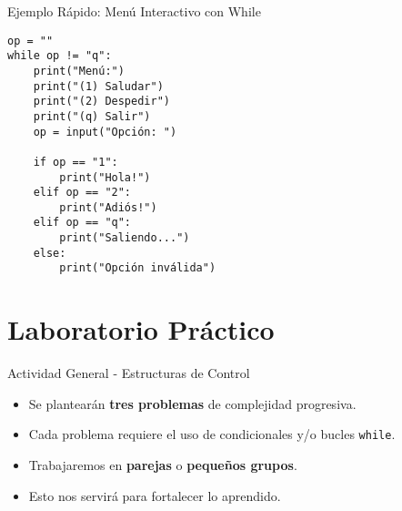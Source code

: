 \documentclass[10pt]{beamer}
\begin{document}
\begin{frame}[fragile]{Ejemplo Rápido: Menú Interactivo con While}
\begin{verbatim}
op = ""
while op != "q":
    print("Menú:")
    print("(1) Saludar")
    print("(2) Despedir")
    print("(q) Salir")
    op = input("Opción: ")

    if op == "1":
        print("Hola!")
    elif op == "2":
        print("Adiós!")
    elif op == "q":
        print("Saliendo...")
    else:
        print("Opción inválida")
\end{verbatim}
\end{frame}

\section{Laboratorio Práctico}

\begin{frame}{Actividad General - Estructuras de Control}
  \begin{itemize}
    \item Se plantearán \textbf{tres problemas} de complejidad progresiva.
    \item Cada problema requiere el uso de condicionales y/o bucles \texttt{while}.
    \item Trabajaremos en \textbf{parejas} o \textbf{pequeños grupos}.
    \item Esto nos servirá para fortalecer lo aprendido.
  \end{itemize}
\end{frame}
\end{document}
